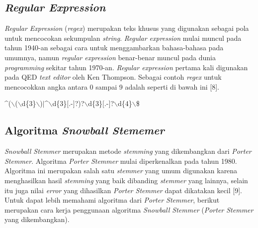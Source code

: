 \subsection{{\itshape Regular Expression}}
\indent
{\itshape Regular Expression} ({\itshape regex}) merupakan teks khusus yang digunakan sebagai pola untuk mencocokan sekumpulan {\itshape string}. {\itshape Regular expression} mulai muncul pada tahun 1940-an sebagai cara untuk menggambarkan bahasa-bahasa pada umumnya, namun {\itshape regular expression} benar-benar muncul pada dunia {\itshape programming} sekitar tahun 1970-an. {\itshape Regular expression} pertama kali digunakan pada QED {\itshape text editor} oleh Ken Thompson. Sebagai contoh {\itshape regex} untuk mencocokkan angka antara 0 sampai 9 adalah seperti di bawah ini [8].

\begin{center}
\^{}($\backslash$($\backslash$d\{3\}$\backslash$)$\mid$\^{}$\backslash$d\{3\}$[$.-$]$?)?$\backslash$d\{3\}$[$.-$]$?$\backslash$d\{4\}$\backslash$\$
\end{center}

\subsection{Algoritma {\itshape Snowball Stememer}}
\indent
{\itshape Snowball Stemmer} merupakan metode {\itshape stemming} yang dikembangkan dari {\itshape Porter Stemmer}. Algoritma {\itshape Porter Stemmer} mulai diperkenalkan pada tahun 1980. Algoritma ini merupakan salah satu {\itshape stemmer} yang umum digunakan karena menghasilkan hasil {\itshape stemming} yang baik dibanding {\itshape stemmer} yang lainnya, selain itu juga nilai {\itshape error} yang dihasilkan {\itshape Porter Stemmer} dapat dikatakan kecil [9]. Untuk dapat lebih memahami algoritma dari {\itshape Porter Stemmer}, berikut merupakan cara kerja penggunaan algoritma {\itshape Snowball Stemmer} ({\itshape Porter Stemmer} yang dikembangkan).

